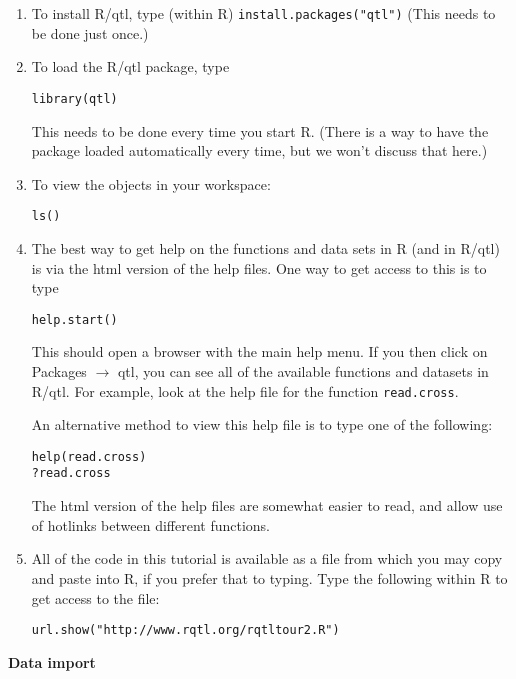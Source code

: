 \documentclass[10pt,letterpaper]{article}
\newcommand{\usercolor}{\color [named]{BlueViolet}}
\newcommand{\othercolor}{\color [named]{Mahogany}}
\begin{document}
\begin{enumerate}

\item To install R/qtl, type (within R) {\usercolor \verb-install.packages("qtl")-}
(This needs to be done just once.)

\item To load the R/qtl package, type

\usercolor \verb|library(qtl)| \normalcolor

This needs to be done every time you start R. (There is a way to
have the package loaded automatically every time, but we won't discuss
that here.)

\item To view the objects in your workspace:

\usercolor \verb|ls()| \normalcolor

\item The best way to get help on the functions and data sets in R
(and in R/qtl) is via the html version of the help files. One way to
get access to this is to type 

\usercolor \verb-help.start()- \normalcolor

This should open a browser with the main help menu.  
If you then click on \othercolor Packages \normalcolor $\rightarrow$
\othercolor qtl\normalcolor , you can see all of the available
functions and datasets in R/qtl.  For example, look at the help file
for the function \verb-read.cross-.

An alternative method to view this help file is to type one of the
following: 

\usercolor \verb|help(read.cross)| \\
\verb|?read.cross| \normalcolor

The html version of the help files are somewhat easier to read, and
allow use of hotlinks between different functions.  

\item All of the code in this tutorial is available as a file from
  which you may copy and paste into R, if you prefer that to typing.
  Type the following within R to get access to the file:

\usercolor \verb-url.show("http://www.rqtl.org/rqtltour2.R")-
\normalcolor

\end{enumerate}


\vspace{12pt}
\textbf{Data import} \vspace{6pt}
\end{document}
